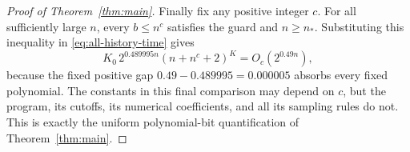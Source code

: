 \begin{proof}[Proof of Theorem~\ref{thm:main}]
Finally fix any positive integer $c$.  For all sufficiently large $n$,
every $b\le n^c$ satisfies the guard and $n\ge n_*$.  Substituting this
inequality in \eqref{eq:all-history-time} gives
\[
 K_0\,2^{0.489995n}(n+n^c+2)^K
 =O_c(2^{0.49n}),
\]
because the fixed positive gap $0.49-0.489995=0.000005$ absorbs every
fixed polynomial.  The constants in this final comparison may depend
on $c$, but the program, its cutoffs, its numerical coefficients, and
all its sampling rules do not.  This is exactly the uniform
polynomial-bit quantification of Theorem~\ref{thm:main}.
\end{proof}
